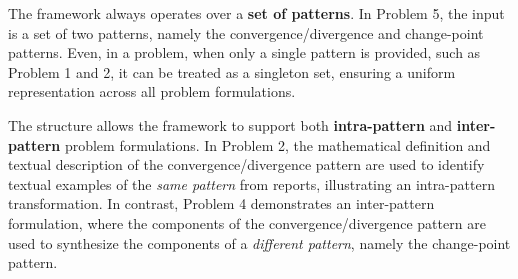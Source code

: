 \documentclass[sigconf,nonacm,anonymous]{acmart}
\begin{document}
The framework always operates over a \textbf{set of patterns}. In Problem 5, the input is a set of two patterns, namely the convergence/divergence and change-point patterns. Even, in a problem, when only a single pattern is provided, such as Problem 1 and 2, it can be treated as a singleton set, ensuring a uniform representation across all problem formulations.

The structure allows the framework to support both \textbf{intra-pattern} and \textbf{inter-pattern} problem formulations. In Problem 2, the mathematical definition and textual description of the convergence/divergence pattern are used to identify textual examples of the \textit{same pattern} from reports, illustrating an intra-pattern transformation. In contrast, Problem 4 demonstrates an inter-pattern formulation, where the components of the convergence/divergence pattern are used to synthesize the components of a \textit{different pattern}, namely the change-point pattern.





\end{document}
